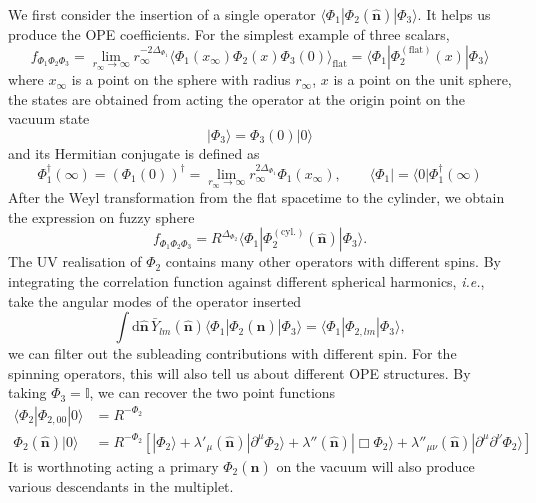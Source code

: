 \documentclass{timesjhep}
\begin{document}
We first consider the insertion of a single operator $\langle\Phi_1|\Phi_2(\hat{\mathbf{n}})|\Phi_3\rangle$. It helps us produce the OPE coefficients. For the simplest example of three scalars, \begin{equation}     f_{\Phi_1\Phi_2\Phi_3}=\lim_{r_\infty\to\infty}r_\infty^{-2\Delta_{\Phi_1}}\langle \Phi_1(x_\infty)\Phi_2(x)\Phi_3(0)\rangle_\mathrm{flat}=\langle\Phi_1|\Phi_2^{(\mathrm{flat})}(x)|\Phi_3\rangle \end{equation} where $x_\infty$ is a point on the sphere with radius $r_\infty$, $x$ is a point on the unit sphere, the states are obtained from acting the operator at the origin point on the vacuum state
\begin{equation} 
    |\Phi_3\rangle=\Phi_3(0)|0\rangle 
\end{equation} 
and its Hermitian conjugate is defined as 
\begin{equation}
    \Phi_1^\dagger(\infty)=(\Phi_1(0))^\dagger=\lim_{r_\infty\to\infty}r_\infty^{2\Delta_{\Phi_1}}\Phi_1(x_\infty),\qquad\langle\Phi_1|=\langle0|\Phi_1^\dagger(\infty) 
\end{equation} 
After the Weyl transformation from the flat spacetime to the cylinder, we obtain the expression on fuzzy sphere 
\begin{equation}
    f_{\Phi_1\Phi_2\Phi_3}=R^{\Delta_{\Phi_2}}\langle\Phi_1|\Phi^{(\mathrm{cyl.})}_2(\hat{\mathbf{n}})|\Phi_3\rangle.
\end{equation} 
The UV realisation of $\Phi_2$ contains many other operators with different spins. By integrating the correlation function against different spherical harmonics, \textit{i.e.}, take the angular modes of the operator inserted 
\begin{equation}
    \int\mathrm{d}\hat{\mathbf{n}}\,\bar{Y}_{lm}(\hat{\mathbf{n}})\langle\Phi_1|\Phi_2(\hat{\mathbf{n}})|\Phi_3\rangle=\langle\Phi_1|\Phi_{2,lm}|\Phi_3\rangle,
\end{equation} 
we can filter out the subleading contributions with different spin. For the spinning operators, this will also tell us about different OPE structures. By taking $\Phi_3=\mathbb{I}$, we can recover the two point functions 
\begin{align}
    \langle\Phi_2|\Phi_{2,00}|0\rangle&=R^{-\Phi_2}\nonumber\\
    \Phi_2(\hat{\mathbf{n}})|0\rangle&=R^{-\Phi_2}\left[|\Phi_2\rangle+\lambda'_\mu(\hat{\mathbf{n}})|\partial^\mu\Phi_2\rangle+\lambda''(\hat{\mathbf{n}})|\Box\Phi_2\rangle+\lambda''_{\mu\nu}(\hat{\mathbf{n}})|\partial^\mu\partial^\nu\Phi_2\rangle\right]
\end{align} 
It is worthnoting acting a primary $\Phi_2(\hat{\mathbf{n}})$ on the vacuum will also produce various descendants in the multiplet. 
\end{document}
